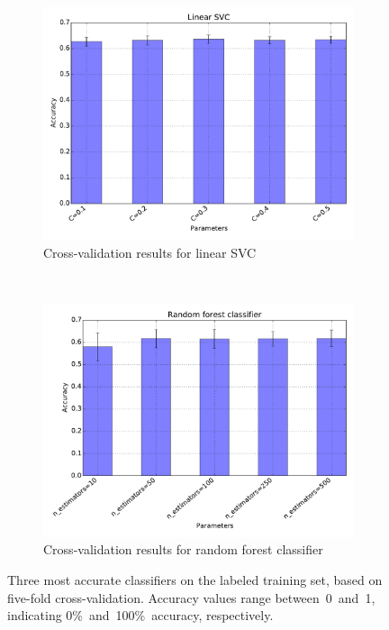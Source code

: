 \documentclass{article}
\begin{document}
\begin{figure}[ht!]
  \ContinuedFloat
  \centering
  \begin{subfigure}{0.66\textwidth}
    \centering
    \includegraphics[width=\textwidth]{Images/Linear_SVC.pdf}
    \caption{Cross-validation results for linear SVC}
    \label{fig:classifiers-linear-svc}
  \end{subfigure} \\
  \begin{subfigure}{0.66\textwidth}
    \centering
    \includegraphics[width=\textwidth]{Images/Random_forest.pdf}
    \caption{Cross-validation results for random forest classifier}
    \label{fig:classifiers-random-forest}
  \end{subfigure}
  \caption{Three most accurate classifiers on the labeled training set, based
           on five-fold cross-validation. Accuracy values range 
           between~0~and~1, indicating 0\%~and~100\%~accuracy, 
           respectively.}\label{fig:classifiers}
\end{figure}
\end{document}
